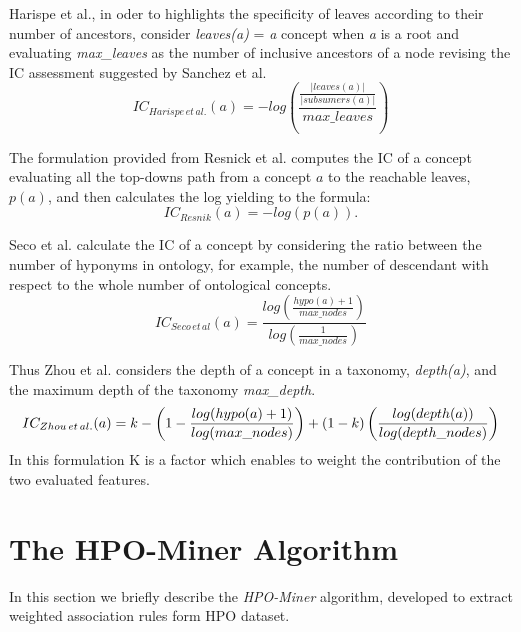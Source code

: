 \documentclass{article}
\theoremstyle{definition}
\begin{document}
Harispe et al., in oder to highlights the specificity of leaves according to their number of ancestors,   consider \emph{leaves(a)} = \emph{a} concept when \emph{a} is a root and evaluating \emph{max\_leaves} as the number of inclusive ancestors of a node revising  the IC assessment  suggested by Sanchez et al.
\begin{equation}
IC_{Harispe\,et\,al.}(a) =-log\left(\frac{\frac{|leaves(a)|}{|subsumers(a)|}}{max\_leaves} \right)
\end{equation}
 
  The  formulation provided from Resnick et al. computes the IC of a concept  evaluating all the top-downs path from a concept $a$ to the reachable leaves, $p(a)$, and then calculates the log  yielding to the formula: \begin{equation}
IC_{Resnik}(a) = -log(p(a)).
 \end{equation}


Seco et al. calculate the IC of a concept by considering the ratio between the number of hyponyms in ontology, for example, the number of descendant with respect to the whole  number of ontological concepts.
\begin{equation}
{IC_{Seco\,et\,al}(a) =\frac{log\left( \frac{hypo(a)+1}{max\_nodes} \right)}{log\left( \frac{1}{max\_nodes} \right)} }
\end{equation}


 Thus Zhou et al. considers the depth of a concept in a taxonomy, \emph{depth(a)}, and the maximum depth of the taxonomy  \emph{max\_depth}.
\begin{equation}
\small{IC_{Zhou\,et\,al.}(a) =k-\left(1- \frac{log(hypo(a)+1)}{log(max\_nodes)} \right)+(1-k)\left(\frac{log(depth(a))}{log(depth\_nodes)} \right)}
\end{equation}
In this formulation K is a factor which enables to weight the contribution of the two evaluated features.








\section{The HPO-Miner Algorithm}
\label{sec:HPO-Miner}

In this section we briefly describe the \textit{HPO-Miner} algorithm, developed to extract weighted association rules form HPO dataset. 
\end{document}
